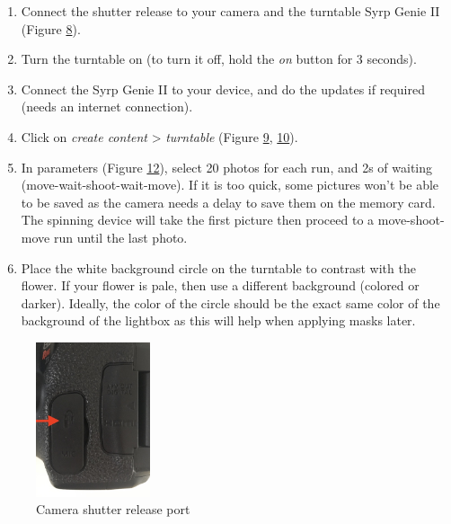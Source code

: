 \documentclass[
]{book}
\theoremstyle{definition}
\theoremstyle{definition}
\theoremstyle{definition}
\theoremstyle{definition}
\theoremstyle{remark}
\begin{document}
\begin{enumerate}
\def\labelenumi{\arabic{enumi}.}
\item
  Connect the shutter release to your camera and the turntable Syrp
  Genie II (Figure \protect\hyperlink{fig:shutter}{8}).
\item
  Turn the turntable on (to turn it off, hold the \emph{on} button for 3
  seconds).
\item
  Connect the Syrp Genie II to your device, and do the updates if
  required (needs an internet connection).
\item
  Click on \emph{create content} \textgreater{} \emph{turntable} (Figure
  \protect\hyperlink{genie_root}{9},
  \protect\hyperlink{genie_content}{10}).
\item
  In parameters (Figure \protect\hyperlink{record}{12}), select 20 photos for each run, and 2s of
  waiting (move-wait-shoot-wait-move). If it is too quick, some
  pictures won't be able to be saved as the camera needs a delay to
  save them on the memory card. The spinning device will take the
  first picture then proceed to a move-shoot-move run until the last
  photo.
\item
  Place the white background circle on the turntable to contrast with
  the flower. If your flower is pale, then use a different background
  (colored or darker). Ideally, the color of the circle should be the
  exact same color of the background of the lightbox as this will help
  when applying masks later.
\end{enumerate}

\begin{figure}
\hypertarget{fig:shutter}{%
\centering
\includegraphics[width=0.3\textwidth,height=\textheight]{Figures/shutter.jpg}
\caption{Camera shutter release port}\label{fig:shutter}
}
\end{figure}
\end{document}
